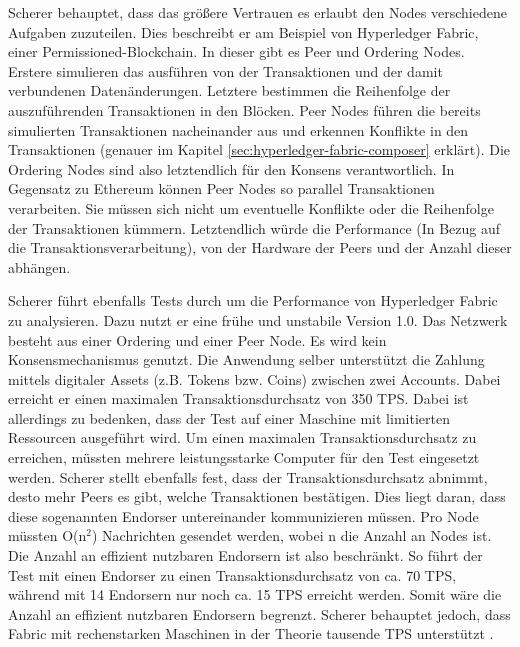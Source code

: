 Scherer behauptet, dass das größere Vertrauen es erlaubt den Nodes verschiedene Aufgaben zuzuteilen. Dies beschreibt er am Beispiel von Hyperledger Fabric, einer Permissioned-Blockchain. In dieser gibt es Peer und Ordering Nodes. Erstere simulieren das ausführen von der Transaktionen und der damit verbundenen Datenänderungen. Letztere bestimmen die Reihenfolge der auszuführenden Transaktionen in den Blöcken. Peer Nodes führen die bereits simulierten Transaktionen nacheinander aus und erkennen Konflikte in den Transaktionen (genauer im Kapitel \ref{sec:hyperledger-fabric-composer} erklärt). Die Ordering Nodes sind also letztendlich für den Konsens verantwortlich. In Gegensatz zu Ethereum können Peer Nodes so parallel Transaktionen verarbeiten. Sie müssen sich nicht um eventuelle Konflikte oder die Reihenfolge der Transaktionen kümmern. Letztendlich würde die Performance (In Bezug auf die Transaktionsverarbeitung), von der Hardware der Peers und der Anzahl dieser abhängen.

Scherer führt ebenfalls Tests durch um die Performance von Hyperledger Fabric zu analysieren. Dazu nutzt er eine frühe und unstabile Version 1.0. Das Netzwerk besteht aus einer Ordering und einer Peer Node. Es wird kein Konsensmechanismus genutzt. Die Anwendung selber unterstützt die Zahlung mittels digitaler Assets (z.B. Tokens bzw. Coins) zwischen zwei Accounts. Dabei erreicht er einen maximalen Transaktionsdurchsatz von 350 TPS. Dabei ist allerdings zu bedenken, dass der Test auf einer Maschine mit limitierten Ressourcen ausgeführt wird. Um einen maximalen Transaktionsdurchsatz zu erreichen, müssten mehrere leistungsstarke Computer für den Test eingesetzt werden. Scherer stellt ebenfalls fest, dass der Transaktionsdurchsatz abnimmt, desto mehr Peers es gibt, welche Transaktionen bestätigen. Dies liegt daran, dass diese sogenannten Endorser untereinander kommunizieren müssen. Pro Node müssten O(n$^2$) Nachrichten gesendet werden, wobei n die Anzahl an Nodes ist. Die Anzahl an effizient nutzbaren Endorsern ist also beschränkt. So führt der Test mit einen Endorser zu einen Transaktionsdurchsatz von ca. 70 TPS, während mit 14 Endorsern nur noch ca. 15 TPS erreicht werden. Somit wäre die Anzahl an effizient nutzbaren Endorsern begrenzt. Scherer behauptet jedoch, dass Fabric mit rechenstarken Maschinen in der Theorie tausende TPS unterstützt \cite{SchererPerformanceScalabilityBlockchain2017}.

